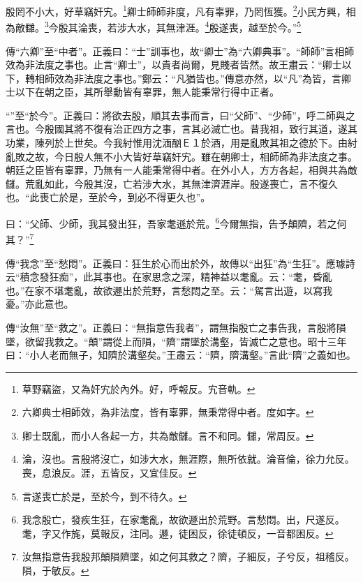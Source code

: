 殷罔不小大，好草竊奸宄。\footnote{草野竊盜，又為奸宄於內外。好，呼報反。宄音軌。}卿士師師非度，凡有辜罪，乃罔恆獲。\footnote{六卿典士相師效，為非法度，皆有辜罪，無秉常得中者。度如字。}小民方興，相為敵讎。\footnote{卿士既亂，而小人各起一方，共為敵讎。言不和同。讎，常周反。}今殷其淪喪，若涉大水，其無津涯。\footnote{淪，沒也。言殷將沒亡，如涉大水，無涯際，無所依就。淪音倫，徐力允反。喪，息浪反。涯，五皆反，又宜佳反。}殷遂喪，越至於今。”\footnote{言遂喪亡於是，至於今，到不待久。}

{\noindent\zhuan{}\fzbyks 傳“六卿”至“中者”。正義曰：“士”訓事也，故“卿士”為“六卿典事”。“師師”言相師效為非法度之事也。止言“卿士”，以貴者尚爾，見賤者皆然。故王肅云：“卿士以下，轉相師效為非法度之事也。”鄭云：“凡猶皆也。”傳意亦然，以“凡”為皆，言卿士以下在朝之臣，其所舉動皆有辜罪，無人能秉常行得中正者。 \par}

{\noindent\shu{}\fzkt “”至“於今”。正義曰：將欲去殷，順其去事而言，曰“父師”、“少師”，呼二師與之言也。今殷國其將不復有治正四方之事，言其必滅亡也。昔我祖，致行其道，遂其功業，陳列於上世矣。今我紂惟用沈湎酗Ｅ１於酒，用是亂敗其祖之德於下。由紂亂敗之故，今日殷人無不小大皆好草竊奸宄。雖在朝卿士，相師師為非法度之事。朝廷之臣皆有辜罪，乃無有一人能秉常得中者。在外小人，方方各起，相與共為敵讎。荒亂如此，今殷其沒，亡若涉大水，其無津濟涯岸。殷遂喪亡，言不復久也。“此喪亡於是，至於今，到必不得更久也”。 \par}

曰：“父師、少師，我其發出狂，吾家耄遜於荒。\footnote{我念殷亡，發疾生狂，在家耄亂，故欲遯出於荒野。言愁悶。出，尺遂反。耄，字又作旄，莫報反，注同。遯，徒困反，徐徒頓反，一音都困反。}今爾無指，告予顛隮，若之何其？”\footnote{汝無指意告我殷邦顛隕隮墜，如之何其救之？隮，子細反，子兮反，祖稽反。隕，于敏反。}


{\noindent\zhuan{}\fzbyks 傳“我念”至“愁悶”。正義曰：狂生於心而出於外，故傳以“出狂”為“生狂”。應璩詩云“積念發狂痴”，此其事也。在家思念之深，精神益以耄亂。云：“耄，昏亂也。”在家不堪耄亂，故欲遯出於荒野，言愁悶之至。云：“駕言出遊，以寫我憂。”亦此意也。 \par}

{\noindent\zhuan{}\fzbyks 傳“汝無”至“救之”。正義曰：“無指意告我者”，謂無指殷亡之事告我，言殷將隕墜，欲留我救之。“顛”謂從上而隕，“隮”謂墜於溝壑，皆滅亡之意也。昭十三年曰：“小人老而無子，知隮於溝壑矣。”王肅云：“隮，隮溝壑。”言此“隮”之義如也。 \par}

